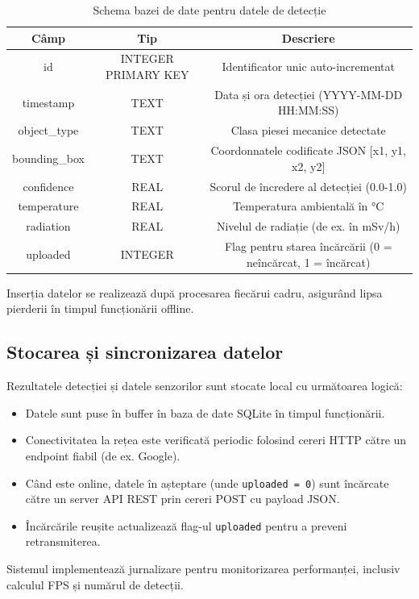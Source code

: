 \documentclass[12pt,a4paper]{article}
\begin{document}
\begin{table}[H]
\centering
\begin{tabular}{|c|c|c|}
\hline
Câmp & Tip & Descriere \\
\hline
id & INTEGER PRIMARY KEY & Identificator unic auto-incrementat \\
\hline
timestamp & TEXT & Data și ora detecției (YYYY-MM-DD HH:MM:SS) \\
\hline
object\_type & TEXT & Clasa piesei mecanice detectate \\
\hline
bounding\_box & TEXT & Coordonnatele codificate JSON [x1, y1, x2, y2] \\
\hline
confidence & REAL & Scorul de încredere al detecției (0.0-1.0) \\
\hline
temperature & REAL & Temperatura ambientală în °C \\
\hline
radiation & REAL & Nivelul de radiație (de ex. în mSv/h) \\
\hline
uploaded & INTEGER & Flag pentru starea încărcării (0 = neîncărcat, 1 = încărcat) \\
\hline
\end{tabular}
\caption{Schema bazei de date pentru datele de detecție}
\end{table}

Inserția datelor se realizează după procesarea fiecărui cadru, asigurând lipsa pierderii în timpul funcționării offline.

\subsection{Stocarea și sincronizarea datelor}

Rezultatele detecției și datele senzorilor sunt stocate local cu următoarea logică:
\begin{itemize}
\item Datele sunt puse în buffer în baza de date SQLite în timpul funcționării.
\item Conectivitatea la rețea este verificată periodic folosind cereri HTTP către un endpoint fiabil (de ex. Google).
\item Când este online, datele în așteptare (unde \texttt{uploaded = 0}) sunt încărcate către un server API REST prin cereri POST cu payload JSON.
\item Încărcările reușite actualizează flag-ul \texttt{uploaded} pentru a preveni retransmiterea.
\end{itemize}

Sistemul implementează jurnalizare pentru monitorizarea performanței, inclusiv calculul FPS și numărul de detecții.
\end{document}
